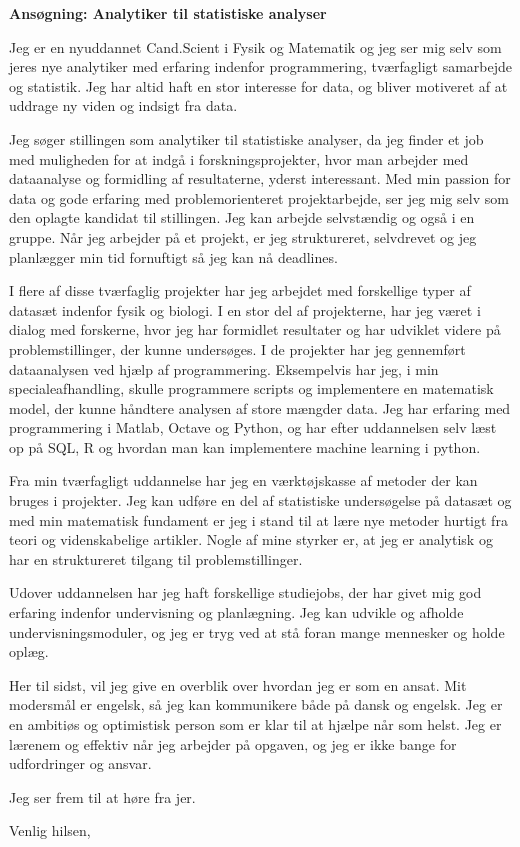 \documentclass[12pt,a4paper]{letter}
\begin{document}
\begin{letter}{}
\opening{\textbf{Ansøgning: Analytiker til statistiske analyser}} 

Jeg er en nyuddannet Cand.Scient i Fysik og Matematik og jeg ser mig selv som jeres nye analytiker med erfaring indenfor programmering, tværfagligt samarbejde og statistik. Jeg har altid haft en stor interesse for data, og bliver motiveret af at uddrage ny viden og indsigt fra data.

Jeg søger stillingen som analytiker til statistiske analyser, da jeg finder et job med muligheden for at indgå i forskningsprojekter, hvor man arbejder med dataanalyse og formidling af resultaterne, yderst interessant. Med min passion for data og gode erfaring med problemorienteret projektarbejde, ser jeg mig selv som den oplagte kandidat til stillingen. Jeg kan arbejde selvstændig og også i en gruppe. Når jeg arbejder på et projekt, er jeg struktureret, selvdrevet og jeg planlægger min tid fornuftigt så jeg kan nå deadlines.      

I flere af disse tværfaglig projekter har jeg arbejdet med forskellige typer af datasæt indenfor fysik og biologi. I en stor del af projekterne, har jeg været i dialog med forskerne, hvor jeg har formidlet resultater og har udviklet videre på problemstillinger, der kunne undersøges. I de projekter har jeg gennemført dataanalysen ved hjælp af programmering. Eksempelvis har jeg, i min specialeafhandling, skulle programmere scripts og implementere en matematisk model, der kunne håndtere analysen af store mængder data. Jeg har erfaring med programmering i Matlab, Octave og Python, og har efter uddannelsen selv læst op på SQL, R og hvordan man kan implementere machine learning i python. 

Fra min tværfagligt uddannelse har jeg en værktøjskasse af metoder der kan bruges i projekter. Jeg kan udføre en del af statistiske undersøgelse på datasæt og med min matematisk fundament er jeg i stand til at lære nye metoder hurtigt fra teori og videnskabelige artikler. Nogle af mine styrker er, at jeg er analytisk og har en struktureret tilgang til problemstillinger. 
 
Udover uddannelsen har jeg haft forskellige studiejobs, der har givet mig god erfaring indenfor undervisning og planlægning. Jeg kan udvikle og afholde undervisningsmoduler, og jeg er tryg ved at stå foran mange mennesker og holde oplæg.

Her til sidst, vil jeg give en overblik over hvordan jeg er som en ansat. Mit modersmål er engelsk, så jeg kan kommunikere både på dansk og engelsk. Jeg er en ambitiøs og optimistisk person som er klar til at hjælpe når som helst. Jeg er lærenem og effektiv når jeg arbejder på opgaven, og jeg er ikke bange for udfordringer og ansvar. 

Jeg ser frem til at høre fra jer.
\closing{Venlig hilsen,}

\end{letter}
\end{document}
